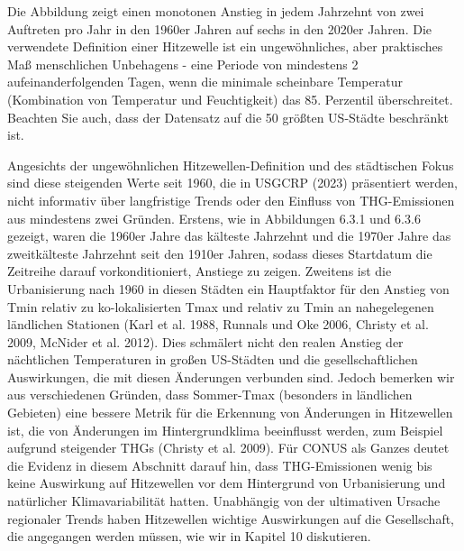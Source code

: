 \documentclass[12pt,paper=a4,DIV=12,parskip=never,chapterprefix=false,headings=standardclasses]{scrreprt}
\begin{document}
Die Abbildung zeigt einen monotonen Anstieg in jedem Jahrzehnt von zwei Auftreten pro Jahr in den 1960er Jahren auf sechs in den 2020er Jahren. Die verwendete Definition einer Hitzewelle ist ein ungewöhnliches, aber praktisches Maß menschlichen Unbehagens - eine Periode von mindestens 2 aufeinanderfolgenden Tagen, wenn die minimale scheinbare Temperatur (Kombination von Temperatur und Feuchtigkeit) das 85. Perzentil überschreitet. Beachten Sie auch, dass der Datensatz auf die 50 größten US-Städte beschränkt ist.

Angesichts der ungewöhnlichen Hitzewellen-Definition und des städtischen Fokus sind diese steigenden Werte seit 1960, die in USGCRP (2023) präsentiert werden, nicht informativ über langfristige Trends oder den Einfluss von THG-Emissionen aus mindestens zwei Gründen. Erstens, wie in Abbildungen 6.3.1 und 6.3.6 gezeigt, waren die 1960er Jahre das kälteste Jahrzehnt und die 1970er Jahre das zweitkälteste Jahrzehnt seit den 1910er Jahren, sodass dieses Startdatum die Zeitreihe darauf vorkonditioniert, Anstiege zu zeigen. Zweitens ist die Urbanisierung nach 1960 in diesen Städten ein Hauptfaktor für den Anstieg von Tmin relativ zu ko-lokalisierten Tmax und relativ zu Tmin an nahegelegenen ländlichen Stationen (Karl et al. 1988, Runnals und Oke 2006, Christy et al. 2009, McNider et al. 2012). Dies schmälert nicht den realen Anstieg der nächtlichen Temperaturen in großen US-Städten und die gesellschaftlichen Auswirkungen, die mit diesen Änderungen verbunden sind. Jedoch bemerken wir aus verschiedenen Gründen, dass Sommer-Tmax (besonders in ländlichen Gebieten) eine bessere Metrik für die Erkennung von Änderungen in Hitzewellen ist, die von Änderungen im Hintergrundklima beeinflusst werden, zum Beispiel aufgrund steigender THGs (Christy et al. 2009). Für CONUS als Ganzes deutet die Evidenz in diesem Abschnitt darauf hin, dass THG-Emissionen wenig bis keine Auswirkung auf Hitzewellen vor dem Hintergrund von Urbanisierung und natürlicher Klimavariabilität hatten. Unabhängig von der ultimativen Ursache regionaler Trends haben Hitzewellen wichtige Auswirkungen auf die Gesellschaft, die angegangen werden müssen, wie wir in Kapitel 10 diskutieren.
\end{document}
